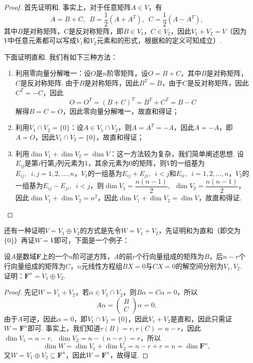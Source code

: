 \begin{proof}
    首先证明和. 事实上，对于任意矩阵$A\in V$，有
    \[A=B+C,\enspace B=\frac{1}{2}(A+A^T),\enspace C=\frac{1}{2}(A-A^T),\]
    其中$B$是对称矩阵，$C$是反对称矩阵，即$B\in V_1$，$C\in V_2$，因此$V_1+V_2=V$（因为$V$中任意元素都可以写成$V_1$和$V_2$元素和的形式，根据和的定义可知成立）.

    下面证明直和. 我们有如下三种方法：
    \begin{enumerate}
        \item 利用零向量分解唯一：设$O$是$n$阶零矩阵，设$O=B+C$，其中$B$是对称矩阵，$C$是反对称矩阵. 由于$B$是对称矩阵，因此$B^T=B$，由于$C$是反对称矩阵，因此$C^T=-C$，因此
              \[O=O^T=(B+C)^T=B^T+C^T=B-C\]
              解得$B=C=O$，因此零向量分解唯一，故直和得证；

        \item 利用$V_1\cap V_2=\{0\}$：设$A\in V_1\cap V_2$，则$A=A^T=-A$，因此$A=-A$，即$A=O$，因此$V_1\cap V_2=\{0\}$，故直和得证；

        \item 利用$\dim V_1+\dim V_2=\dim V$：这一方法较为复杂，我们简单阐述思想. 设$E_{ij}$是第$i$行第$j$列元素为1，其余元素为0的矩阵，则$V$的一组基为$E_{ij},\enspace i,j=1,2,\ldots,n$，$V_1$的一组基为$E_{ij}+E_{ji},\enspace i<j$和$E_{ii},\enspace i=1,2,\ldots,n$，$V_2$的一组基为$E_{ij}-E_{ji},\enspace i<j$，则$\dim V_1=\dfrac{n(n-1)}{2},\enspace \dim V_2=\dfrac{n(n-1)}{2}$，因此$\dim V_1+\dim V_2=n^2$，因此$\dim V_1+\dim V_2=\dim V$，故直和得证.
    \end{enumerate}
\end{proof}

还有一种证明$V=V_1\oplus V_2$的方式是先令$W=V_1+V_2$，先证明和为直和（即交为$\{0\}$）再证$W=V$即可，下面是一个例子：
\begin{example}
    设$A$是数域$\mathbf{F}$上的一个$n$阶可逆方阵，$A$的前$r$个行向量组成的矩阵为$B$，后$n-r$个行向量组成的矩阵为$C$，$n$元线性方程组$BX=0$与$CX=0$的解空间分别为$V_1,V_2$. 证明：$\mathbf{F}^n=V_1\oplus V_2$.
\end{example}

\begin{proof}
    先记$W=V_1+V_2$，若$\alpha\in V_1\cap V_2$，则$B\alpha=C\alpha=0$，所以
    \[A\alpha=\begin{pmatrix}
            B \\
            C
        \end{pmatrix}\alpha=0,\]
    由于$A$可逆，因此$\alpha=0$，即$V_1\cap V_2=\{0\}$，因此$V_1+V_2$是直和，因此只需证$W=\mathbf{F}^n$即可. 事实上，我们知道$r(B)=r,r(C)=n-r$，因此$\dim V_1=n-r,\enspace \dim V_2=n-(n-r)=r$，所以
    \[\dim W=\dim V_1+\dim V_2=n-r+r=n=\dim \mathbf{F}^n,\]
    又$W=V_1\oplus V_2\subseteq \mathbf{F}^n$，因此$W=\mathbf{F}^n$，故得证.
\end{proof}

